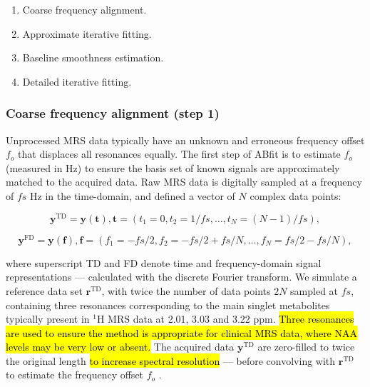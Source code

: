 \documentclass[num-refs]{wiley-article}
\newcommand{\revone}[2]{\hl{#1}\marginnote{\hl{#2}}}
\begin{document}
\begin{enumerate}
  \item Coarse frequency alignment.
  \item Approximate iterative fitting.
  \item Baseline smoothness estimation.
  \item Detailed iterative fitting.
\end{enumerate}

\subsubsection{Coarse frequency alignment (step 1)}
Unprocessed MRS data typically have an unknown and erroneous frequency offset $f_{o}$ that displaces all resonances equally. The first step of ABfit is to estimate $f_{o}$ (measured in Hz) to ensure the basis set of known signals are approximately matched to the acquired data. Raw MRS data is digitally sampled at a frequency of $\mathit{fs}$ Hz in the time-domain, and defined a vector of $N$ complex data points:

\begin{equation}
  \mathbf{y}^{\mathrm{TD}} = \mathbf{y}(\mathbf{t}), \mathbf{t}=(t_{1}=0,t_{2} =1/\mathit{fs},\ldots,t_{N}=(N-1)/\mathit{fs}),
\end{equation}

\begin{equation}
  \mathbf{y}^{\mathrm{FD}} = \mathbf{y}(\mathbf{f}), \mathbf{f}=(f_{1}=-\mathit{fs}/2,f_{2} =-\mathit{fs}/2 + \mathit{fs}/N ,\ldots,f_{N}=\mathit{fs}/2 - \mathit{fs}/N),
\end{equation}

where superscript TD and FD denote time and frequency-domain signal representations --- calculated with the discrete Fourier transform. We simulate a reference data set $\mathbf{r}^{\mathrm{TD}}$, with twice the number of data points $2N$ sampled at $\mathit{fs}$, containing three resonances corresponding to the main singlet metabolites typically present in $^1\mathrm{H}$ MRS data at 2.01, 3.03 and 3.22 ppm. \revone{Three resonances are used to ensure the method is appropriate for clinical MRS data, where NAA levels may be very low or absent.}{R2.9} The acquired data $\mathbf{y}^{\mathrm{TD}}$ are zero-filled to twice the original length \revone{to increase spectral resolution}{R2.9} --- before convolving with  $\mathbf{r}^{\mathrm{TD}}$ to estimate the frequency offset $f_{o}$ \revone{\cite{Provencher1993}}{R1.15}.
\end{document}

